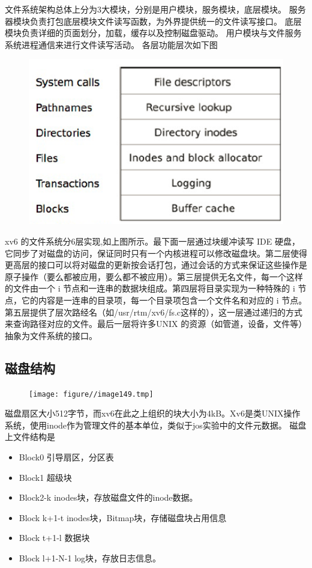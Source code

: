 \documentclass[a4paper,12pt]{report}
\begin{document}
文件系统架构总体上分为3大模块，分别是用户模块，服务模块，底层模块。
服务器模块负责打包底层模块文件读写函数，为外界提供统一的文件读写接口。
底层模块负责详细的页面划分，加载，缓存以及控制磁盘驱动。
用户模块与文件服务系统进程通信来进行文件读写活动。
各层功能层次如下图

\begin{figure}[H]
	\centering
	\includegraphics [width=1.0\textwidth]{figure//image148.png}
\end{figure}

xv6 的文件系统分6层实现,如上图所示。最下面一层通过块缓冲读写 IDE 硬盘，它同步了对磁盘的访问，保证同时只有一个内核进程可以修改磁盘块。第二层使得更高层的接口可以将对磁盘的更新按会话打包，通过会话的方式来保证这些操作是原子操作（要么都被应用，要么都不被应用）。第三层提供无名文件，每一个这样的文件由一个 i 节点和一连串的数据块组成。第四层将目录实现为一种特殊的 i 节点，它的内容是一连串的目录项，每一个目录项包含一个文件名和对应的 i 节点。第五层提供了层次路经名（如/usr/rtm/xv6/fs.c这样的），这一层通过递归的方式来查询路径对应的文件。最后一层将许多UNIX 的资源（如管道，设备，文件等）抽象为文件系统的接口。



\subsection{	磁盘结构}

\begin{figure}[H]
	\centering
	\texttt{[image: figure//image149.tmp]}
\end{figure}
磁盘扇区大小512字节，而xv6在此之上组织的块大小为4kB。Xv6是类UNIX操作系统，使用inode作为管理文件的基本单位，类似于jos实验中的文件元数据。
磁盘上文件结构是
\begin{itemize}
  \item 	Block0 引导扇区，分区表
  \item 	Block1 超级块
  \item 	Block2-k inodes块，存放磁盘文件的inode数据。
  \item 	Block k+1-t inodes块，Bitmap块，存储磁盘块占用信息
  \item 	Block t+1-l 数据块
  \item 	Block l+1-N-1 log块，存放日志信息。
\end{itemize}
\end{document}

